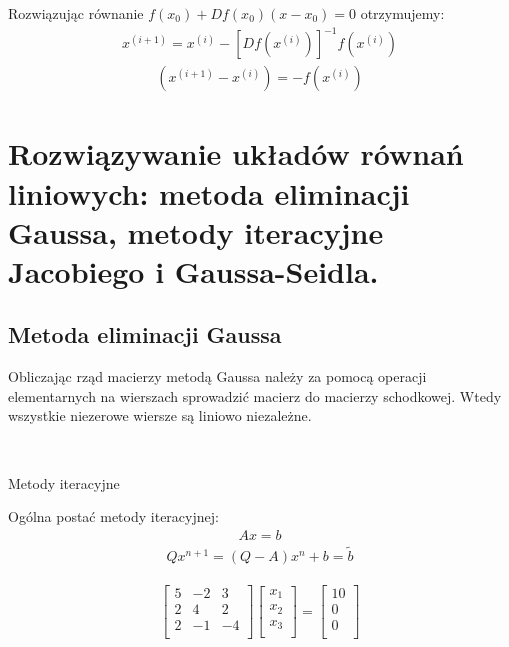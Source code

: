\documentclass[main.tex]{subfiles}
\begin{document}
    Rozwiązując równanie $f(x_0) + Df(x_0)(x - x_0) = 0$ otrzymujemy:
    \begin{align*}
        x^{(i+1)} = x^{(i)} - [Df(x^{(i)})]^{-1} f(x^{(i)})
    \end{align*}
    \begin{align*}
    [Df(x^{(i)})]
        ( x^{(i+1)} - x^{(i)} ) = -f(x^{(i)})
    \end{align*}


    \section{Rozwiązywanie układów równań liniowych: metoda eliminacji Gaussa, metody iteracyjne Jacobiego i Gaussa-Seidla.}

    \subsection{Metoda eliminacji Gaussa}

    Obliczając rząd macierzy metodą Gaussa należy za pomocą operacji elementarnych na wierszach sprowadzić macierz do
    macierzy schodkowej. Wtedy wszystkie niezerowe wiersze są liniowo niezależne.

    \hfill \\
    \begin{center}{\large Metody iteracyjne}\end{center}
    Ogólna postać metody iteracyjnej:
    \begin{align*}
        Ax = b
    \end{align*}
    \begin{align*}
        Qx^{n+1} = (Q - A)x^n + b = \tilde{b}
    \end{align*}

    \begin{align*}
        \begin{bmatrix}
            5 & -2 & 3\\
            2 & 4 & 2\\
            2 & -1 & -4\\
        \end{bmatrix}
        \begin{bmatrix}
            x_1\\
            x_2\\
            x_3\\
        \end{bmatrix}
        =
        \begin{bmatrix}
            10\\
            0\\
            0\\
        \end{bmatrix}
    \end{align*}
\end{document}
